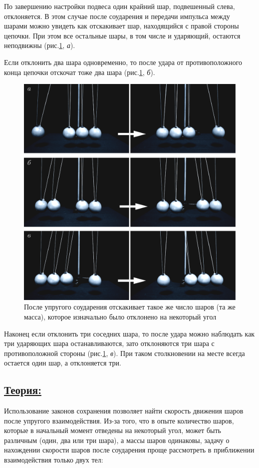 \documentclass[14pt,a4paper,oneside]{extarticle}	%
\begin{document}
По завершению настройки подвеса один крайний шар, подвешенный слева, отклоняется.
В этом случае после соударения и передачи импульса между шарами можно увидеть как отскакивает шар, находящийся с правой стороны цепочки.
При этом все остальные шары, в том числе и ударяющий, остаются неподвижны (рис.\ref{impact-3}, \textit{а}).

Если отклонить два шара одновременно, то после удара от противоположного конца цепочки отскочат тоже два шара (рис.\ref{impact-3}, \textit{б}).
\begin{figure}[H]
	\centering 	
	\includegraphics[width=0.9\linewidth]{impact-3.png}
	\caption{После упругого соударения отскакивает такое же число шаров (та же масса), которое изначально было отклонено на некоторый угол}\label{impact-3}
\end{figure}

Наконец если отклонить три соседних шара, то после удара можно наблюдать как три ударяющих шара останавливаются, зато отклоняются три шара с противоположной стороны (рис.\ref{impact-3}, \textit{в}).
При таком столкновении на месте всегда остается один шар, а отклоняется три. 

\newpage
\subsection*{\underline{Теория:}}

Использование законов сохранения позволяет найти скорость движения шаров после упругого взаимодействия.
Из-за того, что в опыте количество шаров, которые в начальный момент отведены на некоторый угол, может быть различным (один, два или три шара), а массы шаров одинаковы, задачу о нахождении скорости шаров после соударения проще рассмотреть в приближении взаимодействия только двух тел:
\end{document}
